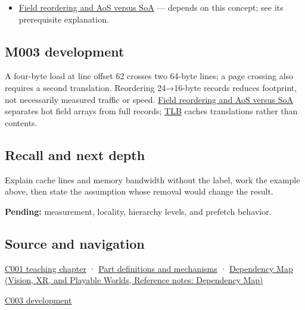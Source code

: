 \hypertarget{appendix-e4ccdbab8320-used-by}{}

\begin{itemize}
\tightlist
\item
  \hyperref[appendix-5522ad176ca0]{Field reordering and AoS versus SoA} --- depends on this concept; see its prerequisite explanation.
\end{itemize}

\subsection{M003 development}\label{appendix-e4ccdbab8320-m003-development}

\hypertarget{appendix-e4ccdbab8320-m003-development}{}

A four-byte load at line offset 62 crosses two 64-byte lines; a page crossing also requires a second translation. Reordering 24→16-byte records reduces footprint, not necessarily measured traffic or speed. \hyperref[appendix-5522ad176ca0]{Field reordering and AoS versus SoA} separates hot field arrays from full records; \hyperref[appendix-7a2d9c5ce511]{TLB} caches translations rather than contents.

\subsection{Recall and next depth}\label{appendix-e4ccdbab8320-recall-and-next-depth}

\hypertarget{appendix-e4ccdbab8320-recall-and-next-depth}{}

Explain cache lines and memory bandwidth without the label, work the example above, then state the assumption whose removal would change the result.

\textbf{Pending:} measurement, locality, hierarchy levels, and prefetch behavior.

\subsection{Source and navigation}\label{appendix-e4ccdbab8320-source-and-navigation}

\hypertarget{appendix-e4ccdbab8320-source-and-navigation}{}

\hyperref[01-foundations-i-ch001-from-a-signal-to-an-interpretation]{C001 teaching chapter} · \hyperref[appendix-fd090d982a15]{Part definitions and mechanisms} · \href{../07-Vision-XR-and-Playable-Worlds/main.pdf\#nameddest=appendix-4ad47bdd269a}{Dependency Map (Vision, XR, and Playable Worlds, Reference notes: Dependency Map)}

\hyperref[01-foundations-i-ch002-where-the-bytes-live]{C003 development}
